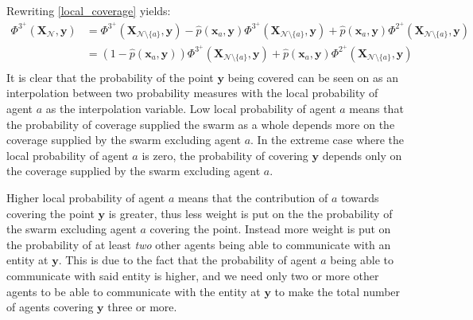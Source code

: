 Rewriting \eqref{local_coverage} yields:
\begin{equation}
  \begin{split}
    \Phi^{3^{+}}(\mathbf{X}_{\mathcal{N}}, \mathbf{y}) &= \Phi^{3^{+}}(\mathbf{X}_{\mathcal{N}\setminus\{a\}}, \mathbf{y}) - \hat{p}(\mathbf{x}_{a}, \mathbf{y})\Phi^{3^{+}}(\mathbf{X}_{\mathcal{N}\setminus\{a\}}, \mathbf{y}) + \hat{p}(\mathbf{x}_{a}, \mathbf{y})\Phi^{2^{+}}(\mathbf{X}_{\mathcal{N}\setminus\{a\}}, \mathbf{y})\\
    &= (1-\hat{p}(\mathbf{x}_{a}, \mathbf{y}))\Phi^{3^{+}}(\mathbf{X}_{\mathcal{N}\setminus\{a\}}, \mathbf{y}) + \hat{p}(\mathbf{x}_{a}, \mathbf{y})\Phi^{2^{+}}(\mathbf{X}_{\mathcal{N}\setminus\{a\}}, \mathbf{y})\\
  \end{split}
\end{equation}
It is clear that the probability of the point $\mathbf{y}$ being covered can be seen on as an interpolation between two probability measures with the local probability of agent $a$ as the interpolation variable. Low local probability of agent $a$ means that the probability of coverage supplied the swarm as a whole depends more on the coverage supplied by
the swarm excluding agent $a$. In the extreme case where the local probability of agent $a$ is zero, the probability of covering $\mathbf{y}$ depends only on the coverage supplied by the swarm excluding agent $a$.

Higher local probability of agent $a$ means that the contribution of $a$ towards covering the point $\mathbf{y}$ is greater, thus less weight is put on the the probability of the swarm excluding agent $a$ covering the point. Instead more weight is put on the probability of at least \textit{two} other agents being able to communicate with an entity at $\mathbf{y}$. 
This is due to the fact that the probability of agent $a$ being able to communicate with said entity is higher, and we need only two or more other agents to be able to communicate with the entity at $\mathbf{y}$ to make the total number of agents covering $\mathbf{y}$ three or more.

